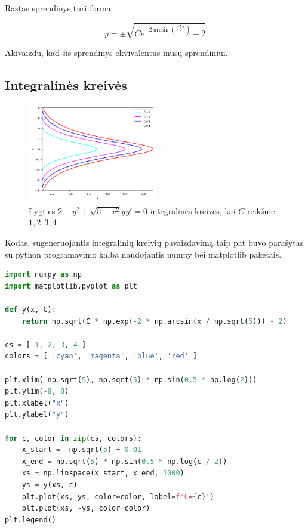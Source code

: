 \documentclass[11pt]{article}
\begin{document}
Rastas sprendinys turi forma:

\begin{equation}
y=\pm\sqrt{Ce^{-2\arcsin(\frac{\sqrt{5}x}{5})}-2}
\end{equation}

Akivaizdu, kad šis sprendinys ekvivalentus mūsų sprendiniui.

\newpage

\subsection{Integralinės kreivės}

\begin{figure}[h!]
    \centering
    \includegraphics[width=0.5\textwidth]{1-updated.png}
    \caption{Lygties $2+y^2+\sqrt{5-x^2}yy'=0$ integralinės kreivės, kai $C$ reikšmė $1, 2, 3, 4$}
    \label{fig:pvz1}
\end{figure}

Kodas, sugeneruojantis integralinių kreivių pavaizdavimą 
taip pat buvo parašytas su python programavimo kalba 
naudojantis numpy bei matplotlib paketais.

\begin{lstlisting}[language=Python]
import numpy as np
import matplotlib.pyplot as plt

def y(x, C):
    return np.sqrt(C * np.exp(-2 * np.arcsin(x / np.sqrt(5))) - 2)

cs = [ 1, 2, 3, 4 ]
colors = [ 'cyan', 'magenta', 'blue', 'red' ]

plt.xlim(-np.sqrt(5), np.sqrt(5) * np.sin(0.5 * np.log(2)))
plt.ylim(-8, 8)
plt.xlabel("x")
plt.ylabel("y")

for c, color in zip(cs, colors):
    x_start = -np.sqrt(5) + 0.01
    x_end = np.sqrt(5) * np.sin(0.5 * np.log(c / 2))
    xs = np.linspace(x_start, x_end, 1000)
    ys = y(xs, c)
    plt.plot(xs, ys, color=color, label=f'C={c}')
    plt.plot(xs, -ys, color=color)
plt.legend()
\end{lstlisting}
\end{document}
